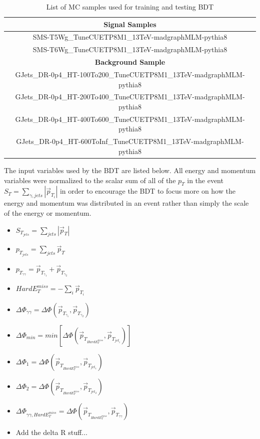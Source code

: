 \begin{table}[h]
	\centering
	\caption{List of MC samples used for training and testing BDT}
	\begin{tabular}{|c|}
		\hline
		\textbf{Signal Samples} \\  
		\hline
		SMS-T5Wg\_TuneCUETP8M1\_13TeV-madgraphMLM-pythia8\\
		\hline
		SMS-T6Wg\_TuneCUETP8M1\_13TeV-madgraphMLM-pythia8\\
		\hline
		\textbf{Background Sample} \\ 
		\hline
		GJets\_DR-0p4\_HT-100To200\_TuneCUETP8M1\_13TeV-madgraphMLM-pythia8 \\
		\hline
		GJets\_DR-0p4\_HT-200To400\_TuneCUETP8M1\_13TeV-madgraphMLM-pythia8 \\
		\hline
		GJets\_DR-0p4\_HT-400To600\_TuneCUETP8M1\_13TeV-madgraphMLM-pythia8 \\
		\hline
		GJets\_DR-0p4\_HT-600ToInf\_TuneCUETP8M1\_13TeV-madgraphMLM-pythia8 \\
		\hline
	\end{tabular}
	\label{table:TrainingSamples}
\end{table}

 The input variables used by the BDT are listed below.  All energy and momentum variables were normalized to the scalar sum of all of the $p_T$ in the event $S_T = \sum_{\gamma,jets} |\vec{p}_{T_i}|$ in order to encourage the BDT to focus more on how the energy and momentum was distributed in an event rather than simply the scale of the energy or momentum.  

\begin{itemize}
	\item $S_{T_{jets}} = \sum_{jets}|\vec{p}_T|$
	\item $p_{T_{jets}} = \sum_{jets}\vec{p}_T$
	\item $p_{T_{\gamma \gamma}} = \vec{p}_{T_{\gamma_1}} + \vec{p}_{T_{\gamma_2}}$
	\item $HardE_T^{miss} = -\sum_{i}\vec{p}_{T_{i}}$
	\item $\Delta \Phi_{\gamma \gamma} = \Delta \Phi (\vec{p}_{T_{\gamma_1}}, \vec{p}_{T_{\gamma_2}})$
	\item $\Delta \Phi_{min} = min[\Delta \Phi (\vec{p}_{T_{HardE_T^{miss}}}, \vec{p}_{T_{jet_i}})]$
	\item $\Delta \Phi_{1} = \Delta \Phi (\vec{p}_{T_{HardE_T^{miss}}}, \vec{p}_{T_{jet_1}})$
	\item $\Delta \Phi_{2} = \Delta \Phi (\vec{p}_{T_{HardE_T^{miss}}}, \vec{p}_{T_{jet_2}})$
	\item $\Delta \Phi_{\gamma \gamma, HardE_T^{miss}} = \Delta \Phi (\vec{p}_{T_{HardE_T^{miss}}}, \vec{p}_{T_{\gamma \gamma}})$
	\item Add the delta R stuff...
\end{itemize}

